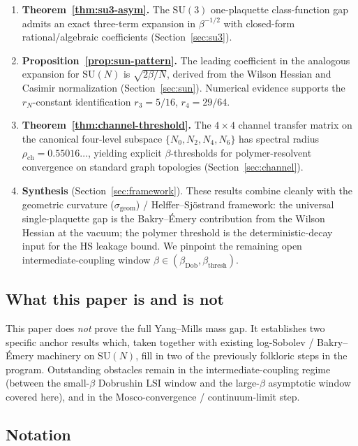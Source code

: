 \documentclass[11pt,a4paper]{article}
\theoremstyle{definition}
\newcommand{\SU}{\mathrm{SU}}
\begin{document}
\begin{enumerate}
\item\textbf{Theorem~\ref{thm:su3-asym}.} The $\SU(3)$ one-plaquette
class-function gap admits an exact three-term expansion in
$\beta^{-1/2}$ with closed-form rational/algebraic coefficients
(Section~\ref{sec:su3}).

\item\textbf{Proposition~\ref{prop:sun-pattern}.} The leading
coefficient in the analogous expansion for $\SU(N)$ is
$\sqrt{2\beta/N}$, derived from the Wilson Hessian and Casimir
normalization (Section~\ref{sec:sun}). Numerical evidence supports
the $r_N$-constant identification $r_3 = 5/16$, $r_4 = 29/64$.

\item\textbf{Theorem~\ref{thm:channel-threshold}.} The $4\times 4$
channel transfer matrix on the canonical four-level subspace
$\{N_0,N_2,N_4,N_6\}$ has spectral radius
$\rho_{\mathrm{ch}} = 0.55016\ldots$, yielding explicit
$\beta$-thresholds for polymer-resolvent convergence on standard
graph topologies (Section~\ref{sec:channel}).

\item\textbf{Synthesis} (Section~\ref{sec:framework}). These results
combine cleanly with the geometric curvature
($\sigma_{\mathrm{geom}}$) / Helffer--Sj\"ostrand framework: the
universal single-plaquette gap is the Bakry--\'Emery contribution
from the Wilson Hessian at the vacuum; the polymer threshold is the
deterministic-decay input for the HS leakage bound. We pinpoint the
remaining open intermediate-coupling window
$\beta\in(\beta_{\mathrm{Dob}},\beta_{\mathrm{thresh}})$.
\end{enumerate}

\subsection{What this paper is and is not}

This paper does \emph{not} prove the full Yang--Mills mass gap. It
establishes two specific anchor results which, taken together with
existing log-Sobolev / Bakry--\'Emery machinery on $\SU(N)$, fill
in two of the previously folkloric steps in the program. Outstanding
obstacles remain in the intermediate-coupling regime (between the
small-$\beta$ Dobrushin LSI window and the large-$\beta$ asymptotic
window covered here), and in the Mosco-convergence / continuum-limit
step.

\subsection{Notation}
\end{document}
